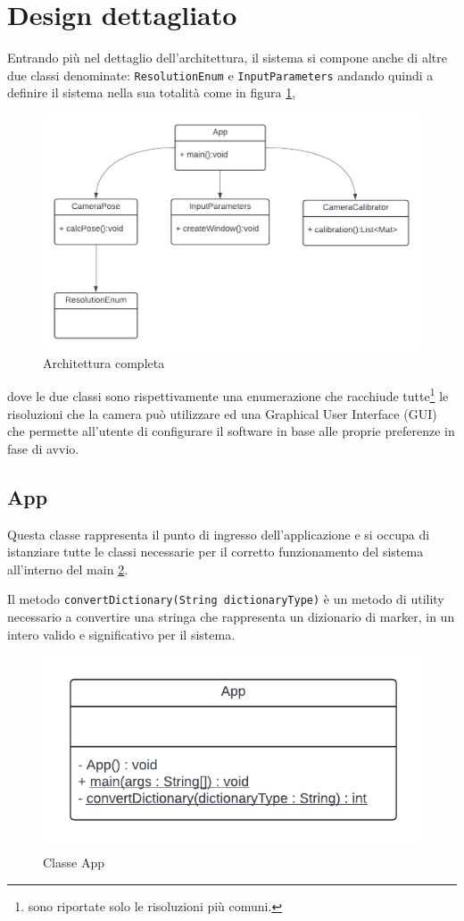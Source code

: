\documentclass[12pt,a4paper,openright,twoside]{book}
\begin{document}
\section{Design dettagliato}
Entrando più nel dettaglio dell'architettura, il sistema si compone anche di altre due classi denominate: \texttt{ResolutionEnum} e \texttt{InputParameters} andando quindi a definire il sistema nella sua totalità come in figura \ref{fig:architettura_completa},
\begin{figure}
	\centering
	\includegraphics[width=0.8\linewidth]{./figures/UML/fullArchitecture.pdf}
	\caption{Architettura completa}
	\label{fig:architettura_completa}
\end{figure}
dove le due classi sono rispettivamente una enumerazione che racchiude tutte\footnote{sono riportate solo le risoluzioni più comuni.} le risoluzioni che la camera può utilizzare ed una Graphical User Interface (GUI) che permette all'utente di configurare il software in base alle proprie preferenze in fase di avvio.
\subsection{App}
Questa classe rappresenta il punto di ingresso dell'applicazione e si occupa di istanziare tutte le classi necessarie per il corretto funzionamento del sistema all'interno del main \ref{fig:app}.

Il metodo \texttt{convertDictionary(String dictionaryType)} è un metodo di utility necessario a convertire una stringa che rappresenta un dizionario di marker, in un intero valido e significativo per il sistema.
\begin{figure}[h!]
	\centering
	\includegraphics[width=0.5\linewidth]{./figures/UML/app.pdf}
	\caption{Classe App}
	\label{fig:app}
\end{figure}
\end{document}
